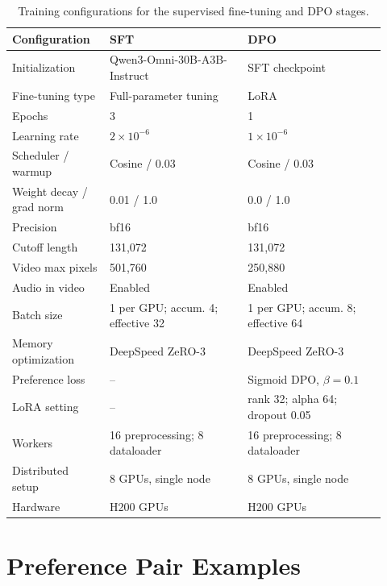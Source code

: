 \documentclass{llmxive}
\providecommand{\arraystretch}{1.05}
\begin{document}
\begin{table}[t]
\centering
\vspace{3pt}
\label{tab:training-config}
\footnotesize
\setlength{\tabcolsep}{5pt}
\renewcommand{\arraystretch}{1.12}
\begin{tabular}{p{0.24\linewidth}p{0.34\linewidth}p{0.34\linewidth}}
\toprule
\textbf{Configuration} & \textbf{SFT} & \textbf{DPO} \\
\midrule
Initialization 
& Qwen3-Omni-30B-A3B-Instruct 
& SFT checkpoint \\
Fine-tuning type 
& Full-parameter tuning 
& LoRA \\
Epochs 
& 3 
& 1 \\
\midrule
Learning rate 
& $2\times 10^{-6}$ 
& $1\times 10^{-6}$ \\
Scheduler / warmup 
& Cosine / 0.03 
& Cosine / 0.03 \\
Weight decay / grad norm 
& 0.01 / 1.0 
& 0.0 / 1.0 \\
Precision 
& bf16 
& bf16 \\
\midrule
Cutoff length 
& 131,072 
& 131,072 \\
Video max pixels 
& 501,760 
& 250,880 \\
Audio in video 
& Enabled 
& Enabled \\
\midrule
Batch size 
& 1 per GPU; accum. 4; effective 32 
& 1 per GPU; accum. 8; effective 64 \\
Memory optimization 
& DeepSpeed ZeRO-3 
& DeepSpeed ZeRO-3 \\
\midrule
Preference loss 
& -- 
& Sigmoid DPO, $\beta=0.1$ \\
LoRA setting 
& -- 
& rank 32; alpha 64; dropout 0.05 \\
\midrule
Workers 
& 16 preprocessing; 8 dataloader 
& 16 preprocessing; 8 dataloader \\
Distributed setup 
& 8 GPUs, single node 
& 8 GPUs, single node \\
Hardware 
& H200 GPUs 
& H200 GPUs \\
\bottomrule
\end{tabular}
\caption{Training configurations for the supervised fine-tuning and DPO stages.}
\end{table}

\section{Preference Pair Examples}
\label{app:preference_examples}
\end{document}
